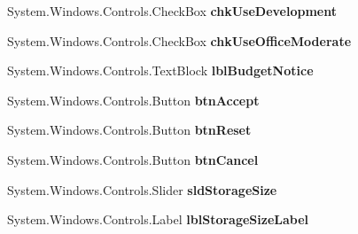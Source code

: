 \begin{DoxyCompactItemize}
\item 
System.\+Windows.\+Controls.\+Check\+Box {\bfseries chk\+Use\+Development}\hypertarget{class_p_c_builder_forms_1_1_questionnaire_aa5e3a716f12c8230813c1ea7e6dbe066}{}\label{class_p_c_builder_forms_1_1_questionnaire_aa5e3a716f12c8230813c1ea7e6dbe066}

\item 
System.\+Windows.\+Controls.\+Check\+Box {\bfseries chk\+Use\+Office\+Moderate}\hypertarget{class_p_c_builder_forms_1_1_questionnaire_ac9b48ad0ed24356de2eca76f241a404a}{}\label{class_p_c_builder_forms_1_1_questionnaire_ac9b48ad0ed24356de2eca76f241a404a}

\item 
System.\+Windows.\+Controls.\+Text\+Block {\bfseries lbl\+Budget\+Notice}\hypertarget{class_p_c_builder_forms_1_1_questionnaire_ad4b2f99b09dba09b72c0a30c5de2889b}{}\label{class_p_c_builder_forms_1_1_questionnaire_ad4b2f99b09dba09b72c0a30c5de2889b}

\item 
System.\+Windows.\+Controls.\+Button {\bfseries btn\+Accept}\hypertarget{class_p_c_builder_forms_1_1_questionnaire_acd21293e6eba54ed7ae80b1961396cb2}{}\label{class_p_c_builder_forms_1_1_questionnaire_acd21293e6eba54ed7ae80b1961396cb2}

\item 
System.\+Windows.\+Controls.\+Button {\bfseries btn\+Reset}\hypertarget{class_p_c_builder_forms_1_1_questionnaire_a98f29008e5166e3805e78b4b3f3cde5a}{}\label{class_p_c_builder_forms_1_1_questionnaire_a98f29008e5166e3805e78b4b3f3cde5a}

\item 
System.\+Windows.\+Controls.\+Button {\bfseries btn\+Cancel}\hypertarget{class_p_c_builder_forms_1_1_questionnaire_aa430b93d2bfaea7fd7ab11efde8fc43b}{}\label{class_p_c_builder_forms_1_1_questionnaire_aa430b93d2bfaea7fd7ab11efde8fc43b}

\item 
System.\+Windows.\+Controls.\+Slider {\bfseries sld\+Storage\+Size}\hypertarget{class_p_c_builder_forms_1_1_questionnaire_a80489b03c4fd52c7068fa7c56dda5534}{}\label{class_p_c_builder_forms_1_1_questionnaire_a80489b03c4fd52c7068fa7c56dda5534}

\item 
System.\+Windows.\+Controls.\+Label {\bfseries lbl\+Storage\+Size\+Label}\hypertarget{class_p_c_builder_forms_1_1_questionnaire_a8b222ca3676f8806e7d4c41165900f87}{}\label{class_p_c_builder_forms_1_1_questionnaire_a8b222ca3676f8806e7d4c41165900f87}


\end{DoxyCompactItemize}
